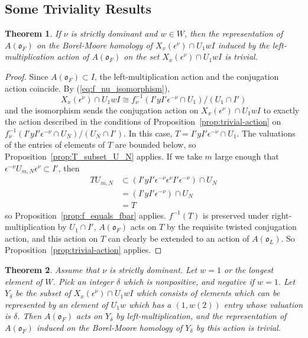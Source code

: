 \documentclass{amsart}
\newtheorem{theorem}{Theorem}
\theoremstyle{definition}
\def\O{\mathfrak{o}}
\def\e{\epsilon}
\def\A{A(\O_F)}
\def\en{\e^{\nu}}
\def\enm{\e^{-\nu}}
\def\X{X_x(\en)}
\def\f{f_\nu}
\def\Umn{U_{m,N}}
\begin{document}
  \subsection{Some Triviality Results}
  \label{sec:triviality-results}
  
  \begin{theorem}
    \label{thm:trivial-on-U-orbit}
    If $\nu$ is strictly dominant and $w \in W$, then the representation of
    $\A$ on the Borel-Moore homology of $\X \cap U_1 wI$ induced by the
    left-multiplication action of $\A$ on the set $\X \cap U_1 wI$ is trivial.
  \end{theorem}
  \begin{proof}
    Since $\A \subset I$, the left-multiplication action and the conjugation
    action coincide.  By (\ref{eq:f_nu_isomorphism}),
    \begin{equation*}
      \X \cap U_1 wI \cong \f^{-1}(I'yI'\enm \cap U_1)/(U_1 \cap I')
    \end{equation*}
    and the isomorphism sends the conjugation action on $\X \cap U_1wI$ to
    exactly the action described in the conditions of
    Proposition~\ref{prop:trivial-action} on $\f^{-1}(I'yI'\enm \cap U_N)/(U_N
    \cap I')$.  In this case, $T = I'yI'\enm \cap U_1$.  The valuations of the
    entries of elements of $T$ are bounded below, so
    Proposition~\ref{prop:T_subset_U_N} applies.  If we take $m$ large enough
    that $\enm\Umn\en \subset I'$, then
    \begin{align*}
      T\Umn &\subset (I'yI'\enm \en I' \enm) \cap U_N \\
      &= (I'yI'\enm) \cap U_N \\
      &= T
    \end{align*}
    so Proposition~\ref{prop:f_equals_fbar} applies.  $f^{-1}(T)$ is preserved
    under right-multiplication by $U_1 \cap I'$, $\A$ acts on $T$ by the
    requisite twisted conjugation action, and this action on $T$ can clearly be
    extended to an action of $A(\O_L)$.  So
    Proposition~\ref{prop:trivial-action} applies.
  \end{proof}
  \begin{theorem}
    \label{thm:trivial-on-a-piece}
    Assume that $\nu$ is strictly dominant.  Let $w = 1$ or the longest element
    of $W$.  Pick an integer $\delta$ which is nonpositive, and negative if $w
    = 1$.  Let $Y_\delta$ be the subset of $\X \cap U_1 w I$ which consists of
    elements which can be represented by an element of $U_1w$ which has a
    $(1,w(2))$ entry whose valuation is $\delta$.  Then $\A$ acts on $Y_\delta$
    by left-multiplication, and the representation of $\A$ induced on the
    Borel-Moore homology of $Y_\delta$ by this action is trivial.
  \end{theorem}
\end{document}
